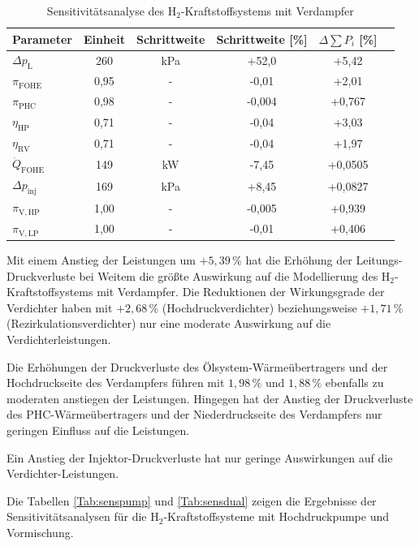 \begin{table}[ht]
	\centering
	\caption{Sensitivitätsanalyse des H$_2$-Kraftstoffsystems mit Verdampfer}
	\begin{tabular} {|l|c|c|c|c|c|} \hline%
		Parameter & Einheit & Schrittweite & Schrittweite [\%] & $ \Delta \sum P_i$ [\%] \\ \hline\hline%
		$\Delta p_\mathrm{L}$ & 260 & \si{\kilo\Pa} & +52,0 & +5,42 \\ \hline 
		$\pi_\mathrm{FOHE}$ & 0,95 & - & -0,01 & +2,01 \\ \hline 
		$\pi_\mathrm{PHC}$ & 0,98 & - & -0,004 & +0,767 \\ \hline 
		$\eta_\mathrm{HP}$ & 0,71 & - & -0,04 & +3,03 \\ \hline 
		$\eta_\mathrm{RV}$ & 0,71 & - & -0,04 & +1,97 \\ \hline 
		$\dot{Q}_\mathrm{FOHE}$ & 149 & \si{\kilo\W} & -7,45 & +0,0505 \\ \hline 
		$\Delta p_\mathrm{inj}$ & 169 & \si{\kilo\Pa} & +8,45 & +0,0827 \\ \hline 
		$\pi_\mathrm{V, HP}$ & 1,00 & - & -0,005 & +0,939 \\ \hline 
		$\pi_\mathrm{V, LP}$ & 1,00 & - & -0,01 & +0,406 \\ \hline 
	\end{tabular}	
	\label{Tab:sensafter}%
\end{table}
\FloatBarrier 

Mit einem Anstieg der Leistungen um  $+5,39\,\%$ hat die Erhöhung der Leitungs-Druckverluste bei Weitem die größte Auswirkung auf die Modellierung des H$_2$-Kraftstoffsystems mit Verdampfer. Die Reduktionen der Wirkungsgrade der Verdichter haben mit $+2,68\,\%$ (Hochdruckverdichter) beziehungsweise $+1,71\,\%$ (Rezirkulationsverdichter) nur eine moderate Auswirkung auf die Verdichterleistungen. 

Die Erhöhungen der Druckverluste des Ölsystem-Wärmeübertragers und der Hochdruckseite des Verdampfers führen mit $1,98\,\%$ und $1,88\,\%$ ebenfalls zu moderaten anstiegen der Leistungen. Hingegen hat der Anstieg der Druckverluste des PHC-Wärmeübertragers und der Niederdruckseite des Verdampfers nur geringen Einfluss auf die Leistungen. 

Ein Anstieg der Injektor-Druckverluste hat nur geringe Auswirkungen auf die Verdichter-Leistungen.


Die Tabellen \ref{Tab:senspump} und \ref{Tab:sensdual} zeigen die Ergebnisse der Sensitivitätsanalysen für die H$_2$-Kraftstoffsysteme mit Hochdruckpumpe und Vormischung.

